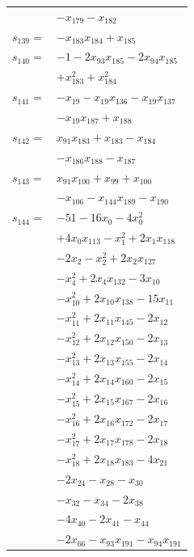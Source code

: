 \begin{longtable}{@{}r@{\;}l@{}}
 & \(\displaystyle -x_{179} -x_{182}\) \\[3pt]
\(s_{139}=\) & \(\displaystyle -x_{183}x_{184} +x_{185}\) \\[3pt]
\(s_{140}=\) & \(\displaystyle -1 -2x_{93}x_{185} -2x_{94}x_{185}\) \\
 & \(\displaystyle +x_{183}^{2} +x_{184}^{2}\) \\[3pt]
\(s_{141}=\) & \(\displaystyle -x_{19} -x_{19}x_{136} -x_{19}x_{137}\) \\
 & \(\displaystyle -x_{19}x_{187} +x_{188}\) \\[3pt]
\(s_{142}=\) & \(\displaystyle x_{91}x_{183} +x_{183} -x_{184}\) \\
 & \(\displaystyle -x_{186}x_{188} -x_{187}\) \\[3pt]
\(s_{143}=\) & \(\displaystyle x_{91}x_{100} +x_{99} +x_{100}\) \\
 & \(\displaystyle -x_{106} -x_{144}x_{189} -x_{190}\) \\[3pt]
\(s_{144}=\) & \(\displaystyle -51 -16x_{0} -4x_{0}^{2}\) \\
 & \(\displaystyle +4x_{0}x_{113} -x_{1}^{2} +2x_{1}x_{118}\) \\
 & \(\displaystyle -2x_{2} -x_{2}^{2} +2x_{2}x_{127}\) \\
 & \(\displaystyle -x_{4}^{2} +2x_{4}x_{132} -3x_{10}\) \\
 & \(\displaystyle -x_{10}^{2} +2x_{10}x_{138} -15x_{11}\) \\
 & \(\displaystyle -x_{11}^{2} +2x_{11}x_{145} -2x_{12}\) \\
 & \(\displaystyle -x_{12}^{2} +2x_{12}x_{150} -2x_{13}\) \\
 & \(\displaystyle -x_{13}^{2} +2x_{13}x_{155} -2x_{14}\) \\
 & \(\displaystyle -x_{14}^{2} +2x_{14}x_{160} -2x_{15}\) \\
 & \(\displaystyle -x_{15}^{2} +2x_{15}x_{167} -2x_{16}\) \\
 & \(\displaystyle -x_{16}^{2} +2x_{16}x_{172} -2x_{17}\) \\
 & \(\displaystyle -x_{17}^{2} +2x_{17}x_{178} -2x_{18}\) \\
 & \(\displaystyle -x_{18}^{2} +2x_{18}x_{183} -4x_{21}\) \\
 & \(\displaystyle -2x_{24} -x_{28} -x_{30}\) \\
 & \(\displaystyle -x_{32} -x_{34} -2x_{38}\) \\
 & \(\displaystyle -4x_{40} -2x_{41} -x_{44}\) \\
 & \(\displaystyle -2x_{66} -x_{93}x_{191} -x_{94}x_{191}\) \\

\end{longtable}
